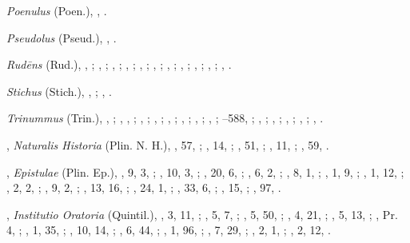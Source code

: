 \begin{autindex}
  \subitem \emph{Poenulus} (Poen.),
    , .

  \subitem \emph{Pseudolus} (Pseud.),
    , .

  \subitem \emph{Rudēns} (Rud.),
    , ;
    , ;
    , ;
    , ;
    , ;
    , ;
    , ;
    , ;
    , ;
    , ;
    , .

  \subitem \emph{Stichus} (Stich.),
    , ;
    , .

  \subitem \emph{Trinummus} (Trin.),
    , ;
    , , ;
    , ;
    , ;
    , ;
    , ;
    , ;
    , ;
    –588, ;
    , ;
    , ;
    , ;
    , ;
    , .

\indexspace

,
  \subitem \emph{Naturalis Historia} (Plin. N. H.),
    , 57, ;
    , 14, ;
    , 51, ;
    , 11, ;
    , 59, .

\indexspace

,
  \subitem \emph{Epistulae} (Plin. Ep.),
    ,  9,  3, ;
    , 10,  3, ;
    , 20,  6, ;
    ,  6,  2, ;
    ,  8,  1, ;
    ,  1,  9, ;
    ,  1, 12, ;
    ,  2,  2, ;
    ,  9,  2, ;
    , 13, 16, ;
    , 24,  1, ;
    , 33,  6, ;
    , 15,     ;
    , 97,     .

\indexspace

,
  \subitem \emph{Institutio Oratoria} (Quintil.),
    ,  3, 11, ;
    ,  5,  7, ;
    ,  5, 50, ;
    ,  4, 21, ;
    ,  5, 13, ;
    , Pr.  4, ;
    ,  1, 35, ;
    , 10, 14, ;
    ,  6, 44, ;
    ,  1, 96, ;
    ,  7, 29, ;
    ,  2,  1, ;
    ,  2, 12, .


\end{autindex}
